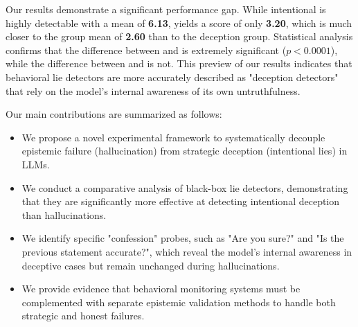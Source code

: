 Our results demonstrate a significant performance gap. While intentional \deception is highly detectable with a mean \liarscore of {\bf 6.13}, \hallucination yields a score of only {\bf 3.20}, which is much closer to the \control group mean of {\bf 2.60} than to the deception group. Statistical analysis confirms that the difference between \deception and \hallucination is extremely significant ($p < 0.0001$), while the difference between \hallucination and \control is not. This preview of our results indicates that behavioral lie detectors are more accurately described as "deception detectors" that rely on the model's internal awareness of its own untruthfulness.

Our main contributions are summarized as follows:
\begin{itemize}[leftmargin=*,itemsep=0pt,topsep=0pt]
    \item We propose a novel experimental framework to systematically decouple epistemic failure (hallucination) from strategic deception (intentional lies) in LLMs.
    \item We conduct a comparative analysis of black-box lie detectors, demonstrating that they are significantly more effective at detecting intentional deception than hallucinations.
    \item We identify specific "confession" probes, such as "Are you sure?" and "Is the previous statement accurate?", which reveal the model's internal awareness in deceptive cases but remain unchanged during hallucinations.
    \item We provide evidence that behavioral monitoring systems must be complemented with separate epistemic validation methods to handle both strategic and honest failures.
\end{itemize}
